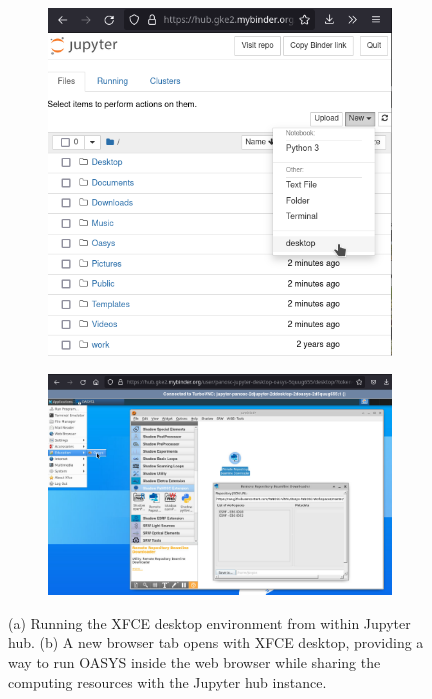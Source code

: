 \documentclass[11pt, a4paper]{article}
\begin{document}
\begin{figure}[htb]
    \centering
    \begin{subfigure}{0.3\textwidth}
        \includegraphics{figures/jupyter_select_desktop.png}
        \caption{}
        \label{fig:jupyter_select}
    \end{subfigure}
    \hfil
    \begin{subfigure}{0.5\textwidth}
        \includegraphics{figures/jupyter_oasys_run.png}
        \caption{}
        \label{fig:oasys_run}
    \end{subfigure}%
    \caption{(a) Running the XFCE desktop environment from within Jupyter hub. (b) A new browser tab opens with XFCE desktop, providing a way to run OASYS inside the web browser while sharing the computing resources with the Jupyter hub instance.}
    \label{fig:oasysJupyter}
\end{figure}
\end{document}
